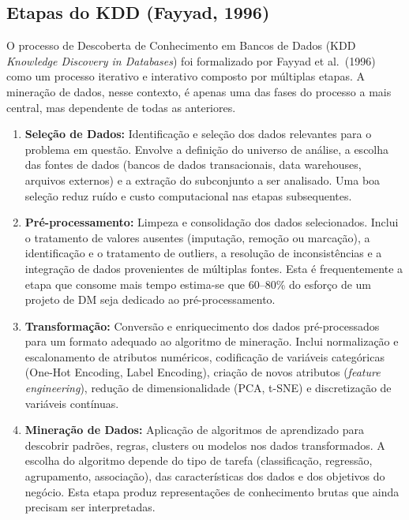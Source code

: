 \documentclass[12pt,a4paper]{article}
\begin{document}
\subsection{Etapas do KDD (Fayyad, 1996)}

O processo de Descoberta de Conhecimento em Bancos de Dados (KDD \textit{Knowledge Discovery in Databases}) foi formalizado por Fayyad et al.\ (1996) como um processo iterativo e interativo composto por múltiplas etapas. A mineração de dados, nesse contexto, é apenas uma das fases do processo a mais central, mas dependente de todas as anteriores.

\begin{enumerate}[leftmargin=*, label=\textbf{Etapa \arabic*:}]
  \item \textbf{Seleção de Dados:} Identificação e seleção dos dados relevantes para o problema em questão. Envolve a definição do universo de análise, a escolha das fontes de dados (bancos de dados transacionais, data warehouses, arquivos externos) e a extração do subconjunto a ser analisado. Uma boa seleção reduz ruído e custo computacional nas etapas subsequentes.

  \item \textbf{Pré-processamento:} Limpeza e consolidação dos dados selecionados. Inclui o tratamento de valores ausentes (imputação, remoção ou marcação), a identificação e o tratamento de outliers, a resolução de inconsistências e a integração de dados provenientes de múltiplas fontes. Esta é frequentemente a etapa que consome mais tempo estima-se que 60--80\% do esforço de um projeto de DM seja dedicado ao pré-processamento.

  \item \textbf{Transformação:} Conversão e enriquecimento dos dados pré-processados para um formato adequado ao algoritmo de mineração. Inclui normalização e escalonamento de atributos numéricos, codificação de variáveis categóricas (One-Hot Encoding, Label Encoding), criação de novos atributos (\textit{feature engineering}), redução de dimensionalidade (PCA, t-SNE) e discretização de variáveis contínuas.

  \item \textbf{Mineração de Dados:} Aplicação de algoritmos de aprendizado para descobrir padrões, regras, clusters ou modelos nos dados transformados. A escolha do algoritmo depende do tipo de tarefa (classificação, regressão, agrupamento, associação), das características dos dados e dos objetivos do negócio. Esta etapa produz representações de conhecimento brutas que ainda precisam ser interpretadas.


\end{enumerate}
\end{document}
